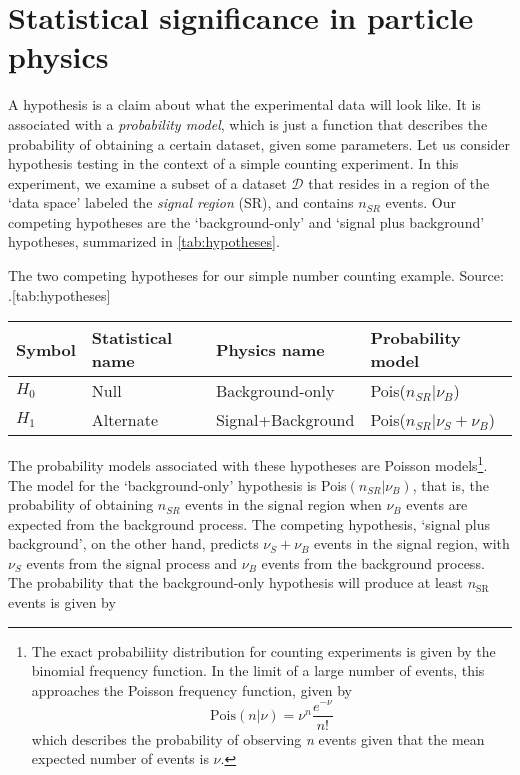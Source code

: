 \section{Statistical significance in particle physics}
A hypothesis is a claim about what the experimental data will look like. It is associated with a \emph{probability model}, which is just a function that describes the probability of obtaining a certain dataset, given some parameters. Let us consider hypothesis testing in the context of a simple counting experiment. In this experiment, we examine a subset of a dataset $\mathcal{D}$ that resides in a region of the `data space' labeled the \emph{signal region} (SR), and contains $n_{SR}$ events. Our competing hypotheses are the `background-only' and `signal plus background' hypotheses, summarized in \autoref{tab:hypotheses}. 
\begin{table}
  \begin{sidecaption}{The two competing hypotheses for our simple number counting example. Source: \cite{Cranmer:2015nia}.}[tab:hypotheses]
  \begin{tabular}{llll}
    \toprule
    Symbol & Statistical name & Physics name & Probability model\\
    \midrule
    $H_0$ & Null & Background-only & Pois($n_{SR}|\nu_B$)\\
    $H_1$ & Alternate & Signal+Background & Pois($n_{SR}|\nu_S+\nu_B$)\\
    \bottomrule
  \end{tabular}
\end{sidecaption}
\end{table}
The probability models associated with these hypotheses are Poisson models\footnote{The exact probabiliity distribution for counting experiments is given by the binomial frequency function. In the limit of a large number of events, this approaches the Poisson frequency function, given by
  \[\text{Pois}(n|\nu) = \nu^n\frac{e^{-\nu}}{n!}\]
  which describes the probability of observing \emph{n} events given that the mean expected number of events is $\nu$.
}. The model for the `background-only' hypothesis is Pois$(n_{SR}|\nu_B)$, that is, the probability of obtaining $n_{SR}$ events in the signal region when $\nu_B$ events are expected from the background process. The competing hypothesis, `signal plus background', on the other hand, predicts $\nu_S+\nu_B$ events in the signal region, with $\nu_S$ events from the signal process and $\nu_B$ events from the background process. The probability that the background-only hypothesis will produce at least $n_\text{SR}$ events is given by
